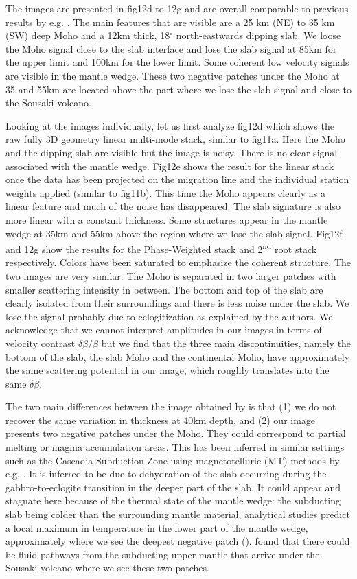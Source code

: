 \documentclass[9pt,a4paper]{article}
\numberwithin{equation}{section}
\begin{document}
\begin{multicols}{2}
The images are presented in fig12d to 12g and are overall comparable to previous results by e.g. \cite{pear_jgr_12}.
The main features that are visible are a 25 km (NE) to 35 km (SW) deep Moho and a 12km thick, 18$^{\circ}$ north-eastwards dipping slab.
We loose the Moho signal close to the slab interface and lose the slab signal at 85km for the upper limit and 100km for the lower limit.
Some coherent low velocity signals are visible in the mantle wedge.
These two negative patches under the Moho at 35 and 55km are located above the part where we lose the slab signal and close to the Sousaki volcano.

Looking at the images individually, let us first analyze fig12d which shows the raw fully 3D geometry linear multi-mode stack, similar to fig11a.
Here the Moho and the dipping slab are visible but the image is noisy.
There is no clear signal associated with the mantle wedge.
Fig12e shows the result for the linear stack once the data has been projected on the migration line and the individual station weights applied (similar to fig11b).
This time the Moho appears clearly as a linear feature and much of the noise has disappeared.
The slab signature is also more linear with a constant thickness.
Some structures appear in the mantle wedge at 35km and 55km above the region where we lose the slab signal.
Fig12f and 12g show the results for the Phase-Weighted stack and 2\textsuperscript{nd} root stack respectively.
Colors have been saturated to emphasize the coherent structure.
The two images are very similar.
The Moho is separated in two larger patches with smaller scattering intensity in between.
The bottom and top of the slab are clearly isolated from their surroundings and there is less noise under the slab.
We lose the signal probably due to eclogitization as explained by the authors.
We acknowledge that we cannot interpret amplitudes in our images in terms of velocity contrast $\delta \beta / \beta$ but we find that the three main discontinuities, namely the bottom of the slab, the slab Moho and the continental Moho, have approximately the same scattering potential in our image, which roughly translates into the same $\delta \beta$.

The two main differences between the image obtained by \cite{pear_jgr_12} is that (1) we do not recover the same variation in thickness at 40km depth, and (2) our image presents two negative patches under the Moho.
They could correspond to partial melting or magma accumulation areas.
This has been inferred in similar settings such as the Cascadia Subduction Zone using magnetotelluric (MT) methods by e.g. \cite{wann_ggg_14}.
It is inferred to be due to dehydration of the slab occurring during the gabbro-to-eclogite transition in the deeper part of the slab.
It could appear and stagnate here because of the thermal state of the mantle wedge: the subducting slab being colder than the surrounding mantle material, analytical studies predict a local maximum in temperature in the lower part of the mantle wedge, approximately where we see the deepest negative patch (\cite{mcga_nat_14}).
\cite{gala_tphy_05} found that there could be fluid pathways from the subducting upper mantle that arrive under the Sousaki volcano where we see these two patches.


\end{multicols}
\end{document}
